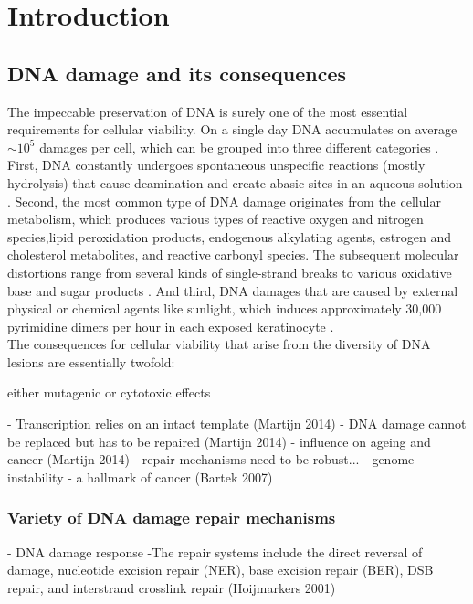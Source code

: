 \chapter{Introduction}
\pagestyle{plain}

\section{DNA damage and its consequences}

The impeccable preservation of DNA is surely one of the most essential requirements for cellular viability. On a single day DNA accumulates on average $\sim\text{10}^\text{5}$ damages per cell, which can be grouped into three different categories \cite{Hoeijmakers2009}. First, DNA constantly undergoes spontaneous unspecific reactions (mostly hydrolysis) that cause deamination and create abasic sites in an aqueous solution \cite{Lindahl1993,Lhomme1999}. Second, the most common type of DNA damage originates from the cellular metabolism, which produces various types of reactive oxygen and nitrogen species,lipid peroxidation products, endogenous alkylating agents, estrogen and cholesterol metabolites, and reactive carbonyl species. The subsequent molecular distortions range from several kinds of single-strand breaks to various oxidative base and sugar products \cite{DeBont2004,Sander2005}. And third, DNA damages that are caused by external physical or chemical agents like sunlight, which induces approximately 30,000 pyrimidine dimers per hour in each exposed keratinocyte \cite{Luijsterburg2010}.\\        
The consequences for cellular viability that arise from the diversity of DNA lesions are essentially twofold:

either mutagenic or cytotoxic effects    

    

 



- Transcription relies on an intact template (Martijn 2014)
- DNA damage cannot be replaced but has to be repaired (Martijn 2014)
- influence on ageing and cancer (Martijn 2014)
- repair mechanisms need to be robust...
- genome instability - a hallmark of cancer (Bartek 2007)



\subsection{Variety of DNA damage repair mechanisms}
- DNA damage response
-The repair systems include the direct reversal of
damage, nucleotide excision repair (NER), base excision repair (BER), DSB repair, and interstrand crosslink repair (Hoijmarkers 2001)

